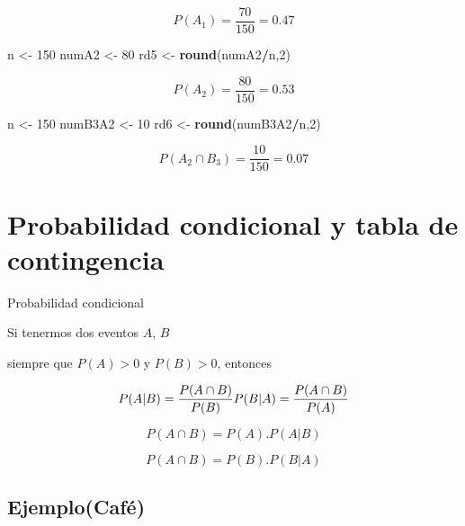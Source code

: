 \documentclass[
]{book}
\newenvironment{Shaded}{\begin{snugshade}}{\end{snugshade}}
\newcommand{\DecValTok}[1]{\textcolor[rgb]{0.00,0.00,0.81}{#1}}
\newcommand{\KeywordTok}[1]{\textcolor[rgb]{0.13,0.29,0.53}{\textbf{#1}}}
\newcommand{\NormalTok}[1]{#1}
\newcommand{\OperatorTok}[1]{\textcolor[rgb]{0.81,0.36,0.00}{\textbf{#1}}}
\newcommand{\StringTok}[1]{\textcolor[rgb]{0.31,0.60,0.02}{#1}}
\theoremstyle{definition}
\theoremstyle{definition}
\theoremstyle{definition}
\theoremstyle{definition}
\theoremstyle{remark}
\begin{document}
\[
P(A_1)=\dfrac{70}{150}= 0.47
\]

\begin{Shaded}
\begin{Highlighting}[]
\NormalTok{n <-}\StringTok{ }\DecValTok{150}
\NormalTok{numA2 <-}\StringTok{ }\DecValTok{80}
\NormalTok{rd5 <-}\StringTok{ }\KeywordTok{round}\NormalTok{(numA2}\OperatorTok{/}\NormalTok{n,}\DecValTok{2}\NormalTok{)}
\end{Highlighting}
\end{Shaded}

\[
P(A_2)=\dfrac{80}{150}= 0.53
\]

\begin{Shaded}
\begin{Highlighting}[]
\NormalTok{n <-}\StringTok{ }\DecValTok{150}
\NormalTok{numB3A2 <-}\StringTok{ }\DecValTok{10}
\NormalTok{rd6 <-}\StringTok{ }\KeywordTok{round}\NormalTok{(numB3A2}\OperatorTok{/}\NormalTok{n,}\DecValTok{2}\NormalTok{)}
\end{Highlighting}
\end{Shaded}

\[
P(A_2\cap B_3)=\dfrac{10}{150}= 0.07
\]

\hypertarget{probabilidad-condicional-y-tabla-de-contingencia}{%
\section{Probabilidad condicional y tabla de contingencia}\label{probabilidad-condicional-y-tabla-de-contingencia}}

Probabilidad condicional

Si tenermos dos eventos \(A\), \(B\)

siempre que \(P(A)>0\) y \(P(B)>0\), entonces

\begin{equation}
P(A|B)=\dfrac{P(A\cap B)}{P(B)}\\
P(B|A)=\dfrac{P(A\cap B)}{P(A)}
\end{equation}

\begin{equation}
P(A\cap B)=P(A).P(A|B)
\end{equation}

\begin{equation}
P(A\cap B)=P(B).P(B|A)
\end{equation}

\hypertarget{ejemplocafuxe9}{%
\subsection{Ejemplo(Café)}\label{ejemplocafuxe9}}
\end{document}
